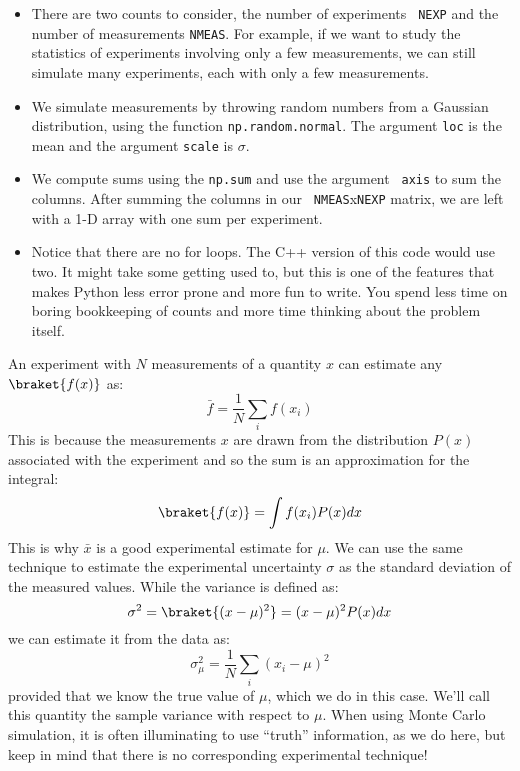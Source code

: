 \begin{itemize}
\item There are two counts to consider, the number of experiments {\tt
  NEXP} and the number of measurements {\tt NMEAS}.  For example, if
  we want to study the statistics of experiments involving only a few
  measurements, we can still simulate many experiments, each with only
  a few measurements.

\item We simulate measurements by throwing random numbers from a
  Gaussian distribution, using the function {\tt np.random.normal}.
  The argument {\tt loc} is the mean and the argument {\tt scale} is
  $\sigma$.

\item We compute sums using the {\tt np.sum} and use the argument {\tt
  axis} to sum the columns.  After summing the columns in our {\tt
  NMEAS}x{\tt NEXP} matrix, we are left with a 1-D array with one sum
  per experiment.
  
\item Notice that there are no for loops.  The C++ version of this code
  would use two.  It might take some getting used to, but this is one
  of the features that makes Python less error prone and more fun to
  write.  You spend less time on boring bookkeeping of counts and more
  time thinking about the problem itself.
\end{itemize}

An experiment with $N$ measurements of a quantity $x$ can estimate any
$\braket{f(x)}$ as:
\begin{displaymath}
\bar{f} = \frac{1}{N} \sum_i f(x_i)
\end{displaymath}
This is because the measurements $x$ are drawn from the distribution $P(x)$ associated with the experiment and so the sum is an approximation for the integral:
\begin{displaymath}
\braket{f(x)} = \int f(x_i) P(x) dx
\end{displaymath}
This is why $\bar{x}$ is a good experimental estimate for
$\mu$.  We can use the same technique to estimate the experimental
uncertainty $\sigma$ as the standard deviation of the measured values.
While the variance is defined as:
\begin{displaymath}
\sigma^2 = \braket{(x-\mu)^2} = (x -\mu)^2 P(x) dx
\end{displaymath}
we can estimate it from the data as:
\begin{displaymath}
\sigma^2_\mu = \frac{1}{N } \sum_i (x_i -\mu)^2 
\end{displaymath}
provided that we know the true value of $\mu$, which we do in this case.  We'll call this quantity
the sample variance with respect to $\mu$.  When using Monte Carlo simulation, it is often illuminating to use ``truth'' information, as we do here, but keep in mind that there is no corresponding experimental technique!

